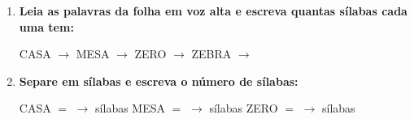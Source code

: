 \begin{exercicio}
\begin{enumerate}[resume]
  \item \textbf{Leia as palavras da folha em voz alta e escreva quantas sílabas cada uma tem:}

  \begin{center}
  CASA $\rightarrow$ \underline{\hspace{1cm}} \quad MESA $\rightarrow$ \underline{\hspace{1cm}} \quad ZERO $\rightarrow$ \underline{\hspace{1cm}} \quad ZEBRA $\rightarrow$ \underline{\hspace{1cm}}
  \end{center}

  \item \textbf{Separe em sílabas e escreva o número de sílabas:}
  \begin{center}
  CASA $=$ \underline{\hspace{1.2cm}} $\rightarrow$ \underline{\hspace{0.8cm}} sílabas \quad MESA $=$ \underline{\hspace{1.2cm}} $\rightarrow$ \underline{\hspace{0.8cm}} sílabas \quad ZERO $=$ \underline{\hspace{1.2cm}} $\rightarrow$ \underline{\hspace{0.8cm}} sílabas
  \end{center}

\end{enumerate}

\end{exercicio}



